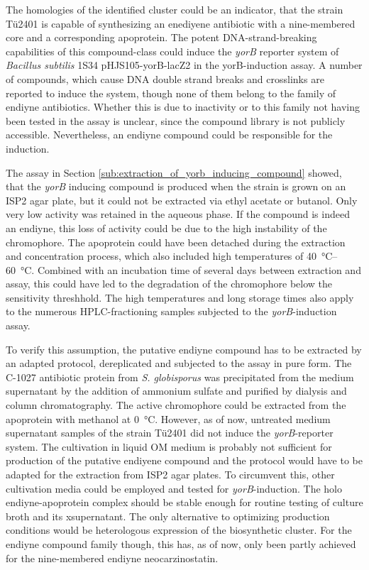 The homologies of the identified cluster could be an indicator, that the strain Tü2401 is capable of synthesizing an enediyene antibiotic with a nine-membered core and a corresponding apoprotein.
 The potent DNA-strand-breaking capabilities of this compound-class could induce the \textit{yorB} reporter system of \textit{Bacillus subtilis} 1S34 pHJS105-yorB-lacZ2 in the yorB-induction assay.
 A number of compounds, which cause DNA double strand breaks and crosslinks are reported to induce the system, though none of them belong to the family of endiyne antibiotics.\autocite{Urban2007}
 Whether this is due to inactivity or to this family not having been tested in the assay is unclear, since the compound library is not publicly accessible.
 Nevertheless, an endiyne compound could be responsible for the induction.

 The assay in Section \ref{sub:extraction_of_yorb_inducing_compound} showed, that the \textit{yorB} inducing compound is produced when the strain is grown on an ISP2 agar plate, but it could not be extracted via ethyl acetate or butanol. Only very low activity was retained in the aqueous phase. If the compound is indeed an endiyne, this loss of activity could be due to the high instability of the chromophore. The apoprotein could have been detached during the extraction and concentration process, which also included high temperatures of \SIrange[range-units=single]{40}{60}{\celsius}. Combined with an incubation time of several days between extraction and assay, this could have led to the degradation of the chromophore below the sensitivity threshhold. The high temperatures and long storage times also apply to the numerous HPLC-fractioning samples subjected to the \textit{yorB}-induction assay.

To verify this assumption, the putative endiyne compound has to be extracted by an adapted protocol, dereplicated and subjected to the assay in pure form.
The C-1027 antibiotic protein from \textit{S. globisporus} was precipitated from the medium supernatant by the addition of ammonium sulfate and purified by dialysis and column chromatography.\autocite{Otani1988a}
The active chromophore could be extracted from the apoprotein with methanol at \SI{0}{\celsius}.\autocite{Matsumoto1993}
However, as of now, untreated medium supernatant samples of the strain Tü2401 did not induce the \textit{yorB}-reporter system.
The cultivation in liquid OM medium is probably not sufficient for production of the putative endiyene compound and the protocol would have to be adapted for the extraction from ISP2 agar plates.
To circumvent this, other cultivation media could be employed and tested for \textit{yorB}-induction.
The holo endiyne-apoprotein complex should be stable enough for routine testing of culture broth and its xsupernatant.
The only alternative to optimizing production conditions would be heterologous expression of the biosynthetic cluster.
For the endiyne compound family though, this has, as of now, only been partly achieved for the nine-membered endiyne neocarzinostatin.\autocite{Zhang2008}

